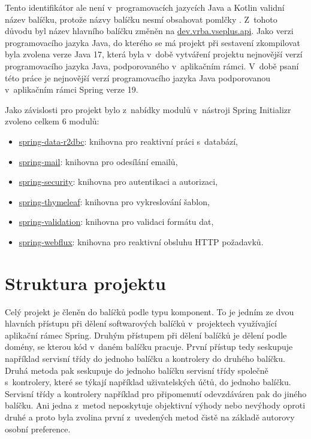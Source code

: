 Tento identifikátor ale není v~programovacích jazycích Java a Kotlin validní název balíčku, protože názvy balíčku nesmí obsahovat pomlčky \cite{gosling_java_2022}. Z~tohoto důvodu byl název hlavního balíčku změněn na \url{dev.vrba.vseplus.api}. Jako verzi programovacího jazyka Java, do kterého se má projekt při sestavení zkompilovat byla zvolena verze Java 17, která byla v~době vytváření projektu nejnovější verzí programovacího jazyka Java, podporovaného v~aplikačním rámci. V~době psaní této práce je nejnovější verzí programovacího jazyka Java podporovanou v~aplikačním rámci Spring verze 19.

Jako závislosti pro projekt bylo z~nabídky modulů v~nástroji Spring Initializr zvoleno celkem 6 modulů:

\begin{itemize}
    \item \url{spring-data-r2dbc}: knihovna pro reaktivní práci s~databází,
    \item \url{spring-mail}: knihovna pro odesílání emailů,
    \item \url{spring-security}: knihovna pro autentikaci a autorizaci,
    \item \url{spring-thymeleaf}: knihovna pro vykreslování šablon,
    \item \url{spring-validation}: knihovna pro validaci formátu dat,
    \item \url{spring-webflux}: knihovna pro reaktivní obsluhu HTTP požadavků.
\end{itemize}

\section{Struktura projektu}

Celý projekt je členěn do balíčků podle typu komponent. To je jedním ze dvou hlavních přístupu při dělení softwarových balíčků v~projektech využívající aplikační rámec Spring. Druhým přístupem při dělení balíčků je dělení podle domény, se kterou kód v~daném balíčku pracuje. První přístup tedy seskupuje například servisní třídy do jednoho balíčku a kontrolery do druhého balíčku. Druhá metoda pak seskupuje do jednoho balíčku servisní třídy společně s~kontrolery, které se týkají například uživatelských účtů, do jednoho balíčku. Servisní třídy a kontrolery například pro připomenutí odevzdáváren pak do jiného balíčku. Ani jedna z~metod neposkytuje objektivní výhody nebo nevýhody oproti druhé a proto byla zvolina první z~uvedených metod čistě na základě autorovy osobní preference. 

